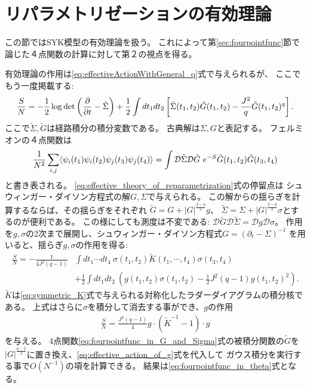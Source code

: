 \section{リパラメトリゼーションの有効理論 \label{sec:effective_theory}}
この節ではSYK模型の有効理論を扱う。
これによって第\ref{sec:fourpointfunc}節で論じた４点関数の計算に対して第２の視点を得る。

有効理論の作用は\eqref{eq:effectiveActionWithGeneral_q}式で与えられるが、
ここでもう一度掲載する:
\begin{align}
	\frac{S}{N}
	= -\frac{1}{2}\log\det\left(\frac{\partial}{\partial t} - \tilde{\Sigma}\right)
		+ \frac{1}{2}\int dt_1dt_2
		\left[
			\tilde{\Sigma}(t_1, t_2)\tilde{G}(t_1, t_2)
			- \frac{J^2}{q}\tilde{G}(t_1, t_2)^q
		\right].
	\label{eq:effective_theory_of_reparametrization}
\end{align}
ここで$\tilde{\Sigma},\tilde{G}$は経路積分の積分変数である。
古典解は$\Sigma, G$と表記する。
フェルミオンの４点関数は
\begin{align}
	\frac{1}{N^2}\sum_{i,j}\average{\psi_i(t_1)\psi_i(t_2)\psi_j(t_3)\psi_j(t_4)}
	= \int \mathcal{D}\tilde{\Sigma}\mathcal{D}\tilde{G}\ 
		e^{-S}\tilde{G}(t_1, t_2)\tilde{G}(t_3, t_4)
	\label{eq:fourpointfunc_in_G_and_Sigma}
\end{align}
と書き表される。
\eqref{eq:effective_theory_of_reparametrization}式の停留点は
シュウィンガー・ダイソン方程式の解$G,\Sigma$で与えられる。
この解からの揺らぎを計算するならば、その揺らぎをそれぞれ
$\tilde{G} = G + |G|^{\frac{2-q}{2}}g$、
$\tilde{\Sigma} = \Sigma + |G|^{\frac{2-q}{2}}\sigma$とするのが便利である。
この様にしても測度は不変である: 
$\mathcal{D}\tilde{G}\mathcal{D}\tilde{\Sigma} = \mathcal{D}g\mathcal{D}\sigma$。
作用を$g,\sigma$の2次まで展開し、シュウィンガー・ダイソン方程式$G = (\partial_t - \Sigma)^{-1}$
を用いると、揺らぎ$g,\sigma$の作用を得る:
\begin{align}
	\frac{S}{N}
		= -\frac{1}{4J^2(q-1)}&\int dt_1\cdots dt_4\ 
			\sigma(t_1, t_2)\tilde{K}(t_1, \cdots, t_4)\sigma(t_3, t_4)\nonumber\\
		&+ \frac{1}{2}\int dt_1dt_2\ 
		\left(
			g(t_1, t_2)\sigma(t_1, t_2) - \frac{1}{2}J^2(q-1)g(t_1, t_2)^2
		\right).
\end{align}
$\tilde{K}$は\eqref{eq:symmetric_K}式で与えられる対称化したラダーダイアグラムの積分核である。
上式はさらに$\sigma$を積分して消去する事ができ、$g$の作用
\begin{align}
	\frac{S}{N} = \frac{J^2(q-1)}{4}g\cdot(\tilde{K}^{-1} - 1)\cdot g
	\label{eq:effective_action_of_g}
\end{align}
を与える。
4点関数\eqref{eq:fourpointfunc_in_G_and_Sigma}式の被積分関数の$\tilde{G}$を
$|G|^{\frac{q-2}{2}}$に置き換え、\eqref{eq:effective_action_of_g}式を代入して
ガウス積分を実行する事で$O(N^{-1})$の項を計算できる。
結果は\eqref{eq:fourpointfunc_in_theta}式となる。

